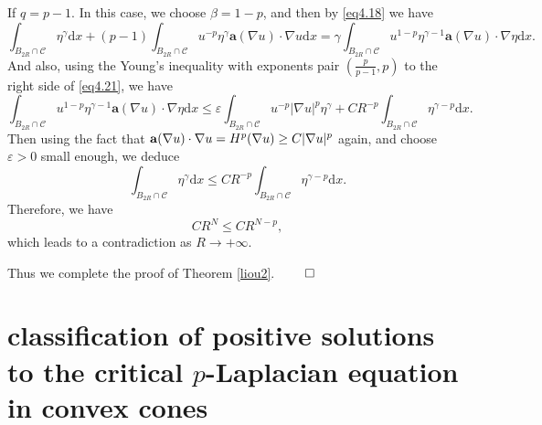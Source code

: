 \documentclass[12pt]{amsart}
\theoremstyle{definition}
\theoremstyle{remark}
\theoremstyle{conclusion}
\theoremstyle{conjecture}
\numberwithin{equation}{section}
\begin{document}
 If $q=p-1$. In this case, we choose $\beta=1-p$, and then by \eqref{eq4.18} we have
\begin{equation}\label{eq4.21}
  \int_{B_{2R}\cap\mathcal{C}}\eta^{\gamma}\mathrm{d}x+(p-1)\int_{B_{2R}\cap\mathcal{C}}u^{-p}\eta^{\gamma}{\mathbf{a}}(\nabla u)\cdot\nabla u\mathrm{d}x=\gamma\int_{B_{2R}\cap\mathcal{C}}u^{1-p}\eta^{\gamma-1}{\mathbf{a}}(\nabla u)\cdot\nabla \eta\mathrm{d}x.
\end{equation}
And also, using the Young's inequality with exponents pair $(\frac{p}{p-1},p)$ to the right side of \eqref{eq4.21}, we have
$$\int_{B_{2R}\cap\mathcal{C}}u^{1-p}\eta^{\gamma-1}{\mathbf{a}}(\nabla u)\cdot\nabla \eta\mathrm{d}x\leq \varepsilon\int_{B_{2R}\cap\mathcal{C}}u^{-p}|\nabla u|^p\eta^{\gamma}+CR^{-p}\int_{B_{2R}\cap\mathcal{C}}\eta^{\gamma-p}\mathrm{d}x.$$
Then using the fact that ${\bf{a}}(\nabla u)\cdot\nabla u=H^p(\nabla u)\geq C|\nabla u|^p$ again, and choose $\varepsilon>0$ small enough, we deduce
$$\int_{B_{2R}\cap\mathcal{C}}\eta^{\gamma}\mathrm{d}x\leq CR^{-p}\int_{B_{2R}\cap\mathcal{C}}\eta^{\gamma-p}\mathrm{d}x.$$
Therefore, we have
$$CR^N\leq CR^{N-p},$$
which leads to a contradiction as $R\rightarrow+\infty$.

Thus we complete the proof of Theorem \ref{liou2}. \qquad\qquad\qquad\quad$\qed$


\section{classification of positive solutions to the critical $p$-Laplacian equation in convex cones}
\end{document}
